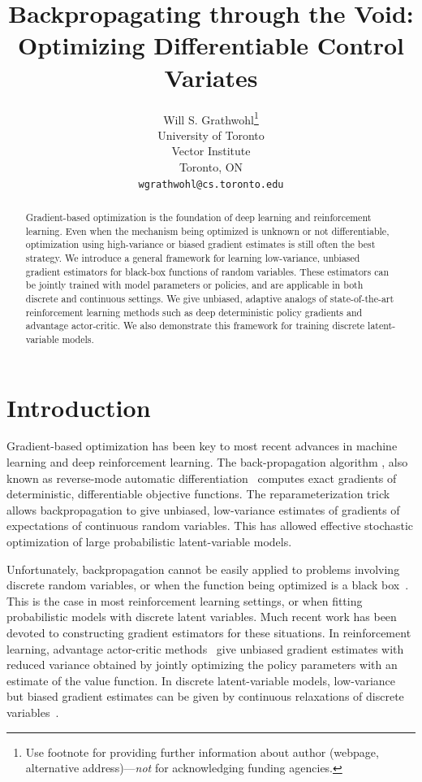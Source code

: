 \documentclass{article}
\title{Backpropagating through the Void:\\ Optimizing Differentiable Control Variates}
\author{
  Will S. Grathwohl\thanks{Use footnote for providing further
    information about author (webpage, alternative
    address)---\emph{not} for acknowledging funding agencies.} \\
  University of Toronto\\
  Vector Institute\\
  Toronto, ON \\
  \texttt{wgrathwohl@cs.toronto.edu} \\
}
\begin{document}
\maketitle
\begin{abstract}
Gradient-based optimization is the foundation of deep learning and reinforcement learning.
Even when the mechanism being optimized is unknown or not differentiable, optimization using high-variance or biased gradient estimates is still often the best strategy.
We introduce a general framework for learning low-variance, unbiased gradient estimators for black-box functions of random variables.
These estimators can be jointly trained with model parameters or policies, and are applicable in both discrete and continuous settings.
We give unbiased, adaptive analogs of state-of-the-art reinforcement learning methods such as deep deterministic policy gradients and advantage actor-critic.
We also demonstrate this framework for training discrete latent-variable models.
\end{abstract}


\section{Introduction}
Gradient-based optimization has been key to most recent advances in machine learning and deep reinforcement learning.
The back-propagation algorithm \citep{rumelhart1986learning}, also known as reverse-mode automatic differentiation~\citep{speelpenning1980compiling, rall1981automatic} computes exact gradients of deterministic, differentiable objective functions.
The reparameterization trick \citep{williams1992simple, kingma2013autoencoding, rezende2014stochastic} allows backpropagation to give unbiased, low-variance estimates of gradients of expectations of continuous random variables.
This has allowed effective stochastic optimization of large probabilistic latent-variable models.

Unfortunately, backpropagation cannot be easily applied to problems involving discrete random variables, or when the function being optimized is a black box~\citep{schulman2015gradient}.
This is the case in most reinforcement learning settings, or when fitting probabilistic models with discrete latent variables.
Much recent work has been devoted to constructing gradient estimators for these situations.
In reinforcement learning, advantage actor-critic methods~\citep{mnih2016asynchronous} give unbiased gradient estimates with reduced variance obtained by jointly optimizing the policy parameters with an estimate of the value function.
In discrete latent-variable models, low-variance but biased gradient estimates can be given by continuous relaxations of discrete variables~\citep{maddison2016concrete, jang2016categorical}.
\end{document}
